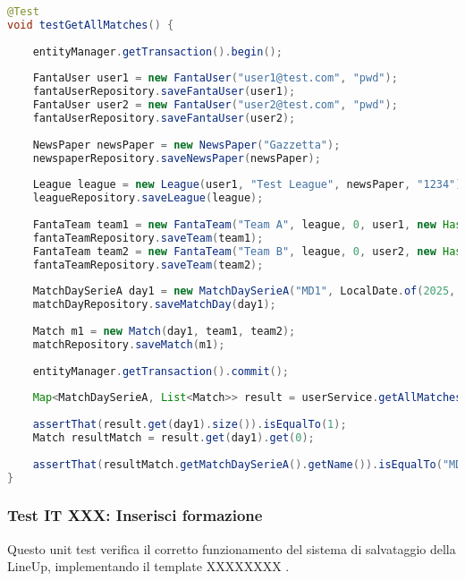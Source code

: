 \begin{lstlisting}[language=Java]
@Test
void testGetAllMatches() {
		
	entityManager.getTransaction().begin();
		
	FantaUser user1 = new FantaUser("user1@test.com", "pwd");
	fantaUserRepository.saveFantaUser(user1);
	FantaUser user2 = new FantaUser("user2@test.com", "pwd");
	fantaUserRepository.saveFantaUser(user2);
		
	NewsPaper newsPaper = new NewsPaper("Gazzetta");
	newspaperRepository.saveNewsPaper(newsPaper);
		
	League league = new League(user1, "Test League", newsPaper, "1234");
	leagueRepository.saveLeague(league);
		
	FantaTeam team1 = new FantaTeam("Team A", league, 0, user1, new HashSet<Contract>());
	fantaTeamRepository.saveTeam(team1);
	FantaTeam team2 = new FantaTeam("Team B", league, 0, user2, new HashSet<Contract>());
	fantaTeamRepository.saveTeam(team2);
		
	MatchDaySerieA day1 = new MatchDaySerieA("MD1", LocalDate.of(2025, 9, 7));
	matchDayRepository.saveMatchDay(day1);
		
	Match m1 = new Match(day1, team1, team2);
	matchRepository.saveMatch(m1);
		
	entityManager.getTransaction().commit();
		
	Map<MatchDaySerieA, List<Match>> result = userService.getAllMatches(league);		
		
	assertThat(result.get(day1).size()).isEqualTo(1);
	Match resultMatch = result.get(day1).get(0);
		
	assertThat(resultMatch.getMatchDaySerieA().getName()).isEqualTo("MD1");
}
\end{lstlisting}


\subsubsection{Test IT XXX: Inserisci formazione}

Questo unit test verifica il corretto funzionamento del sistema di salvataggio della LineUp,
implementando il template XXXXXXXX .

